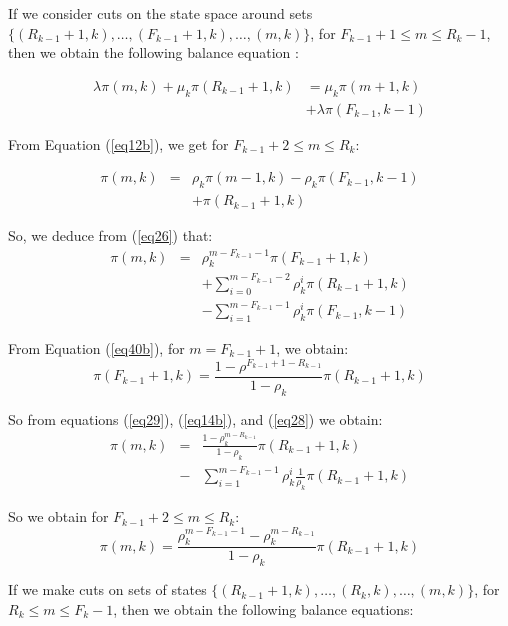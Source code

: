 \documentclass[conference]{IEEEtran}
\begin{document}
\noindent
If we consider cuts on the state space around sets $\{(R_{k-1}+1,k), \ldots,(F_{k-1}+1,k),\ldots,(m,k)\}$, for  $F_{k-1}+1 \leq m \leq R_{k}-1$,
then we obtain the following balance equation : 

\begin{eqnarray}
\lambda \pi(m,k) + \mu_k \pi(R_{k-1}+1,k)&=\mu_k \pi(m+1,k) \nonumber \\
&+ \lambda \pi(F_{k-1},k-1)
 \label{eq12b}
\end{eqnarray}


\noindent From Equation (\ref{eq12b}), we get for  $F_{k-1}+2 \leq m \leq R_{k}$:


\begin{eqnarray}
\pi(m,k) &=& \rho_k \pi(m-1,k)-\rho_k \pi(F_{k-1},k-1) \nonumber\\
&&+ \pi(R_{k-1}+1,k)
\label{eq26}
\end{eqnarray}



\noindent So, we deduce from (\ref{eq26}) that:
\begin{eqnarray}
\pi(m,k)&=& \rho_k^{m-F_{k-1}-1}\pi(F_{k-1}+1,k) \nonumber\\
&&+
\sum_{i=0}^{m-F_{k-1}-2} \rho_k^i\pi(R_{k-1}+1,k) \nonumber \\ 
&& -\sum_{i=1}^{m-F_{k-1}-1} \rho_k^i \pi(F_{k-1},k-1)
\label{eq28}
\end{eqnarray}


From Equation (\ref{eq40b}), for $m=F_{k-1}+1$, we obtain:
\begin{equation}
\pi(F_{k-1}+1,k)=\frac{1-\rho^{ F_{k-1}+1-R_{k-1}} }{1-\rho_k}\pi(R_{k-1}+1,k)
\label{eq29}
\end{equation}

So from equations (\ref{eq29}), (\ref{eq14b}), and (\ref{eq28})  we obtain:
\begin{eqnarray}
\pi(m,k)&=&\frac{1-\rho_k^{m-R_{k-1}} } {1-\rho_k} \pi(R_{k-1}+1,k) \nonumber\\
&-& \sum_{i=1}^{m-F_{k-1}-1} \rho_k^i \frac{1}{\rho_k} \pi(R_{k-1}+1,k)
\label{eq30}
\end{eqnarray}

So we obtain for $F_{k-1}+2 \leq m \leq R_{k}$:
\begin{equation}
\pi(m,k)= \frac{\rho_k^{m-F_{k-1}-1}-\rho_k^{m-R_{k-1}} } {1-\rho_k} \pi(R_{k-1}+1,k)
\label{eq31}
\end{equation}


If we make cuts on sets of states $\{(R_{k-1}+1,k),\ldots,(R_{k},k),\ldots, (m,k)\}$, for $R_k \leq m \leq F_k-1$, then we obtain the following balance equations:
\end{document}
